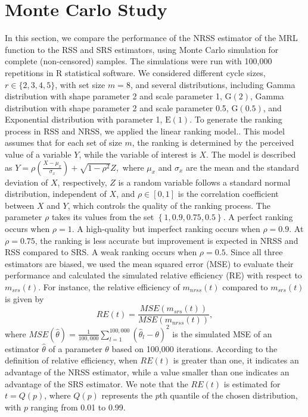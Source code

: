 \documentclass[twoside]{article}
\begin{document}
\section{Monte Carlo Study} \label{Sec4}
In this section, we compare the performance of the NRSS estimator of the MRL function to the RSS and SRS estimators, using Monte Carlo simulation  for complete (non-censored) samples.  The simulations were run with 100,000 repetitions in  \textsf{R} statistical software.
We considered different cycle sizes, $r \in \{2,3,4,5\}$, with set size $m=8$, and several distributions, including  Gamma distribution with shape parameter 2 and scale parameter 1, $\mathrm{G}(2)$,  Gamma distribution with shape parameter 2 and scale parameter 0.5, $\mathrm{G}(0.5)$, and Exponential distribution with parameter 1, $\mathrm{E}(1)$.
  To generate the ranking process in RSS and NRSS, we applied
the linear ranking model.. This 
model assumes that for each set of size $m$, the ranking is determined by the perceived value of a variable 
$Y$, while the variable of interest is $X$. The model is described as 
$
Y=\rho\left(\frac{X-\mu_{x}}{\sigma_{x}}\right)+\sqrt{1-\rho^{2}}Z,
$
where $\mu_{x}$ and $\sigma_{x}$ are the mean and the standard deviation
of $X$, respectively, $Z$ is a random variable follows a standard
normal distribution, independent of $X$, and $\rho\in\left[0,1\right]$
is the correlation coefficient between $X$ and $Y$, which controls
the quality of the ranking process. The parameter $\rho$ takes its
values from the set $\left\{ 1,0.9,0.75,0.5\right\} $. A perfect ranking
occurs when $\rho=1$. A high-quality but imperfect ranking occurs when $\rho=0.9$. At $\rho=0.75$, the ranking is less accurate but improvement is expected in NRSS and RSS compared to SRS. A weak ranking occurs when
$\rho=0.5$.   Since all three estimators are biased, we used the mean squared error (MSE) to evaluate their performance and calculated the simulated relative efficiency (RE) with respect to $m_{srs}(t)$. For instance, the relative efficiency
of $m_{nrss}(t)$ compared to $m_{srs}(t)$ is given by 
$$
RE\left(t\right)=\frac{MSE\left(m_{srs}\left(t\right)\right)}{MSE\left(m_{nrss}\left(t\right)\right)},
$$
where $MSE\left(\hat \theta\right) = \frac{1}{{100,000}}{\sum\nolimits_{l = 1}^{100,000} {\left( {\hat \theta_{l}  - \theta } \right)} ^2}$ is  the simulated MSE of an estimator $\hat\theta$ of a parameter  $\theta$ based on 100,000 iterations. According to the definition of relative efficiency, when $RE(t)$ is greater than one, it indicates an advantage of the NRSS estimator, while a value smaller than one indicates an advantage of the SRS estimator. We note that the $RE(t)$ is estimated for $t=Q(p)$, where $Q(p)$ represents the $p$th quantile of the chosen distribution, with $p$ ranging from 0.01 to 0.99.
\end{document}
